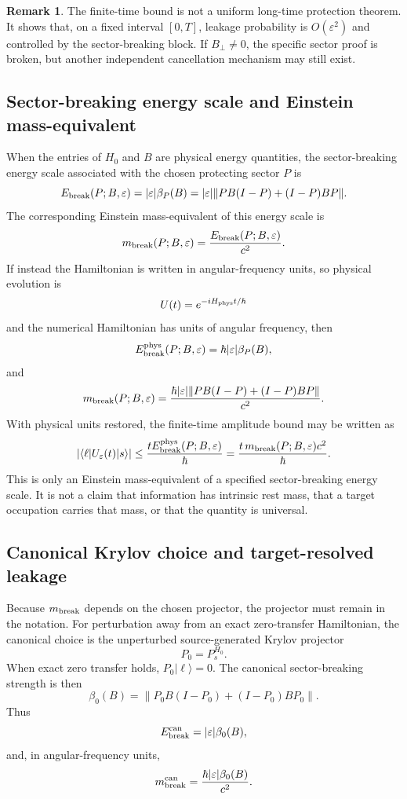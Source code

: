 \documentclass[11pt]{article}
\theoremstyle{definition}
\newtheorem{remark}[theorem]{Remark}
\begin{document}
\begin{remark}
The finite-time bound is not a uniform long-time protection theorem. It shows that, on a fixed interval $[0,T]$, leakage probability is $O(\varepsilon^2)$ and controlled by the sector-breaking block. If $B_\perp\ne0$, the specific sector proof is broken, but another independent cancellation mechanism may still exist.
\end{remark}

\subsection{Sector-breaking energy scale and Einstein mass-equivalent}
When the entries of $H_0$ and $B$ are physical energy quantities, the sector-breaking energy scale associated with the chosen protecting sector $P$ is
\[
E_{\rm break}(P;B,\varepsilon)=|\varepsilon|\beta_P(B)=|\varepsilon|\|PB(I-P)+(I-P)BP\|.
\]
The corresponding Einstein mass-equivalent of this energy scale is
\[
m_{\rm break}(P;B,\varepsilon)=\frac{E_{\rm break}(P;B,\varepsilon)}{c^2}.
\]
If instead the Hamiltonian is written in angular-frequency units, so physical evolution is
\[
U(t)=e^{-iH_{\rm phys}t/\hbar}
\]
and the numerical Hamiltonian has units of angular frequency, then
\[
E_{\rm break}^{\rm phys}(P;B,\varepsilon)=\hbar |\varepsilon|\beta_P(B),
\]
and
\[
m_{\rm break}(P;B,\varepsilon)=\frac{\hbar |\varepsilon|\|PB(I-P)+(I-P)BP\|}{c^2}.
\]
With physical units restored, the finite-time amplitude bound may be written as
\[
|\langle \ell|U_\varepsilon(t)|s\rangle|\le \frac{tE_{\rm break}^{\rm phys}(P;B,\varepsilon)}{\hbar}=\frac{t\,m_{\rm break}(P;B,\varepsilon)c^2}{\hbar}.
\]
This is only an Einstein mass-equivalent of a specified sector-breaking energy scale. It is not a claim that information has intrinsic rest mass, that a target occupation carries that mass, or that the quantity is universal.

\subsection{Canonical Krylov choice and target-resolved leakage}
Because $m_{\rm break}$ depends on the chosen projector, the projector must remain in the notation. For perturbation away from an exact zero-transfer Hamiltonian, the canonical choice is the unperturbed source-generated Krylov projector
\[
P_0=P_s^{H_0}.
\]
When exact zero transfer holds, $P_0|\ell\rangle=0$. The canonical sector-breaking strength is then
\[
\beta_0(B)=\|P_0B(I-P_0)+(I-P_0)BP_0\|.
\]
Thus
\[
E_{\rm break}^{\rm can}=|\varepsilon|\beta_0(B),
\]
and, in angular-frequency units,
\[
m_{\rm break}^{\rm can}=\frac{\hbar |\varepsilon|\beta_0(B)}{c^2}.
\]
\end{document}
